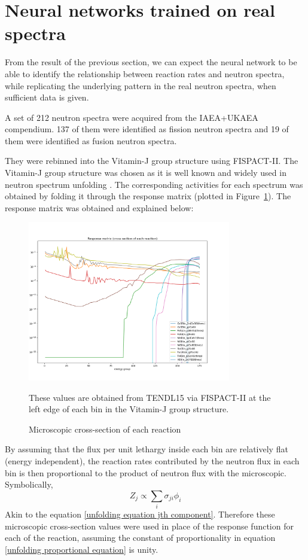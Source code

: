 \documentclass[a4paper, 12pt]{article}
\begin{document}
\section{Neural networks trained on real spectra}\label{RealResults}
From the result of the previous section, we can expect the neural network to be able to identify the relationship between reaction rates and neutron spectra, while replicating the underlying pattern in the real neutron spectra, when sufficient data is given.

A set of 212 neutron spectra were acquired from the IAEA+UKAEA compendium\cite{IAEAUKAEACompendium}. 137 of them were identified as fission neutron spectra and 19 of them were identified as fusion neutron spectra.

They were rebinned into the Vitamin-J group structure using FISPACT-II\cite{Fispact}. The Vitamin-J group structure was chosen as it is well known and widely used in neutron spectrum unfolding \cite{SpectrumUnfoldingMethodology} \cite{ADRIANA_lab_equiv} \cite{Stayslpnnl}. The corresponding activities for each spectrum was obtained by folding it through the response matrix (plotted in Figure~\ref{response_matrix}). The response matrix was obtained and explained below:

\begin{figure}
\centering
\includegraphics[height=7cm]{PPT/response_matrix.png}
\caption{Microscopic cross-section of each reaction}\label{response_matrix}
These values are obtained from TENDL15 via FISPACT-II \cite{Fispact} at the left edge of each bin in the Vitamin-J group structure. 
\end{figure}
By assuming that the flux per unit lethargy inside each bin are relatively flat (energy independent), the reaction rates contributed by the neutron flux in each bin is then proportional to the product of neutron flux with the microscopic. Symbolically,
\begin{equation} \label{unfolding proportional equation}
    Z_j \propto \sum_i \sigma_{ji} \phi_i
\end{equation}
Akin to the equation \ref{unfolding equation jth component}. Therefore these microscopic cross-section values were used in place of the response function for each of the reaction, assuming the constant of proportionality in equation \ref{unfolding proportional equation} is unity.
\end{document}
